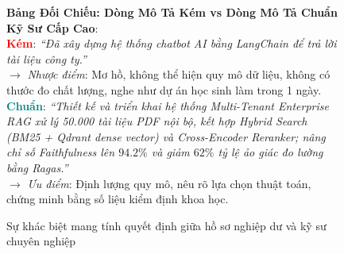 \begin{figure}[htbp]
\centering
\begin{tcolorbox}[colback=boxbg,colframe=primarycolor,width=0.95\textwidth,arc=2pt]
\small
\textbf{Bảng Đối Chiếu: Dòng Mô Tả Kém vs Dòng Mô Tả Chuẩn Kỹ Sư Cấp Cao}:\\[0.2cm]
\textcolor{red}{\textbf{Kém}}: \textit{``Đã xây dựng hệ thống chatbot AI bằng LangChain để trả lời tài liệu công ty.''}\\
$\longrightarrow$ \textit{Nhược điểm}: Mơ hồ, không thể hiện quy mô dữ liệu, không có thước đo chất lượng, nghe như dự án học sinh làm trong 1 ngày.\\[0.2cm]
\textcolor{teal}{\textbf{Chuẩn}}: \textit{``Thiết kế và triển khai hệ thống Multi-Tenant Enterprise RAG xử lý 50.000 tài liệu PDF nội bộ, kết hợp Hybrid Search (BM25 + Qdrant dense vector) và Cross-Encoder Reranker; nâng chỉ số Faithfulness lên $94.2\%$ và giảm $62\%$ tỷ lệ ảo giác đo lường bằng Ragas.''}\\
$\longrightarrow$ \textit{Ưu điểm}: Định lượng quy mô, nêu rõ lựa chọn thuật toán, chứng minh bằng số liệu kiểm định khoa học.
\end{tcolorbox}
\caption{Sự khác biệt mang tính quyết định giữa hồ sơ nghiệp dư và kỹ sư chuyên nghiệp}
\label{fig:career-resume-comparison}
\end{figure}

